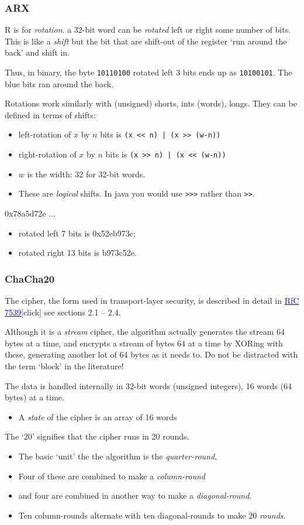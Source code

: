 \documentclass[10pt, hyperref={pdfpagelabels=false}]{beamer}
\begin{document}
\begin{frame}
\frametitle{ARX}
R is for \emph{rotation}. a 32-bit word can be \emph{rotated} left or right some number of bits. This is like a \emph{shift} but the bit that are shift-out of the register `run around the back' and shift in.

Thus, in binary, the byte \texttt{10110100} rotated left 3 bits ends up as \texttt{10100\color{blue}101}. The {\color{blue}blue} bits ran around the back.

Rotations work similarly with (unsigned) shorts, ints (words), longs. They can be defined in terms of shifts:
\begin{itemize}
\item left-rotation of $x$ by $n$ bits is \texttt{(x << n) | (x >> (w-n))}
\item right-rotation of $x$ by $n$ bits is \texttt{(x >> n) | (x << (w-n))}
\item $w$ is the width: 32 for 32-bit words. 
\item These are \emph{logical} shifts. In java you would use \texttt{>>>} rather than \texttt{>>}. 
\end{itemize}

0x78a5d72e ...
\begin{itemize}
\item rotated left 7 bits is 0x52eb973c;
\item rotated right 13 bits is b973c52e.
\end{itemize}
\end{frame}

\begin{frame}
\frametitle{ChaCha20}
The cipher, the form used in transport-layer security, is described in detail in \href{https://tools.ietf.org/html/rfc7539}{\textcolor{blue}{RfC 7539}}[click] see sections 2.1 -- 2.4.

Although it is a \emph{stream} cipher, the algorithm actually generates the stream 64 bytes at a time, and encrypts a stream of bytes 64 at a time by XORing with these, generating another lot of 64 bytes as it needs to. Do not be distracted with the term `block' in the literature!

The data is handled internally in 32-bit words (unsigned integers), 16 words (64 bytes) at a time. 
\begin{itemize}
\item A \emph{\color{blue}state} of the cipher is an array of 16 words
\end{itemize}

The `20' signifies that the cipher runs in 20 rounds.
\begin{itemize}
\item The basic `unit' the the algorithm is the \emph{\color{blue}quarter-round},
\item Four of these are combined to make a \emph{\color{blue}column-round}
\item and four are combined in another way to make a \emph{\color{blue}diagonal-round}.
\item Ten column-rounds alternate with ten diagonal-rounds to make 20 \emph{rounds}.
\end{itemize}
\end{frame}
\end{document}
